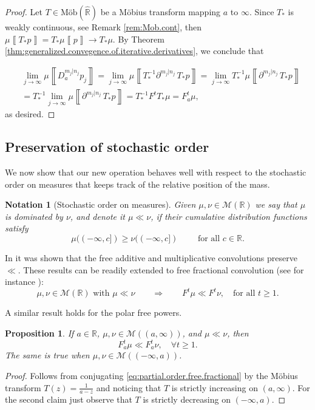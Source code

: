 \documentclass[reqno,11pt]{amsart}
\newtheorem{proposition}[theorem]{Proposition}
\newtheorem{notation}[theorem]{Notation}
\theoremstyle{remark}
\newcommand{\rr}{\mathbb{R}}
\newcommand{\MM}{\mathcal{M}}
\newcommand{\diff}[2]{\partial^{#1|#2}\, }  %
\newcommand{\polars}[3]{D_{#1}^{#2|#3}}
\newcommand{\freepower}[1]{F^{#1}}
\newcommand{\pfreepower}[2]{F_{#1}^{#2}}
\newcommand{\mobr}{\text{Möb}(\hat{\rr})}
\newcommand{\meas}[1]{\mu \left\llbracket #1 \right\rrbracket}
\begin{document}
\begin{proof}
Let $T\in\mobr $ be a Möbius transform mapping $ a $ to $\infty$. Since $ T_* $ is weakly continuous, see Remark \ref{rem:Mob.cont}, then $ \meas{T_* {p}}=T_*\meas{p} \to T_*\mu$. By Theorem \ref{thm:generalized.convegence.of.iterative.derivatives}, we conclude that

\begin{align*}
    &\lim_{j\to\infty} \meas{\polars{a}{m_j}{n_j} p_j}=\lim_{j\to \infty} \meas{T_*^{-1}\diff{m_j}{n_j}T_* p} = \lim_{j\to \infty} T_*^{-1}\meas{\diff{m_j}{n_j}T_* p}\\
    &= T_*^{-1}\lim_{j\to \infty} \meas{\diff{m_j}{n_j}T_* {p}} = T_*^{-1}\freepower{t}T_*\mu= \pfreepower{a}{t}\mu,
\end{align*}
as desired.
\end{proof}


\subsection{Preservation of stochastic order}
We now show that our new operation behaves well with respect to the stochastic order on measures that keeps track of the relative position of the mass.

\begin{notation}[Stochastic order on measures]
Given $\mu, \nu\in \MM(\rr)$ we say that $\mu$ is dominated by $\nu$, and denote it $\mu \ll \nu$, if their cumulative distribution functions satisfy
\[\mu((-\infty,c]) \geq \nu((-\infty,c]) \qquad \text{ for all }c\in \rr.\]
\end{notation}

In \cite[Propositions 4.15 and 4.16]{bercovici1993free} it was shown that the free additive and multiplicative convolutions preserve $\ll$. These results can be readily extended to free fractional convolution (see for instance \cite[Corollary 4.2]{arizmendi2024s}):
\begin{equation}
\label{eq:partial.order.free.fractional}
\mu,\nu\in \MM(\rr) \text{ with }\mu \ll \nu \qquad \Rightarrow \qquad  \freepower{t}\mu \ll \freepower{t}\nu,\quad \text{for all } t\geq 1.    
\end{equation}

A similar result holds for the polar free powers.
\begin{proposition}
    If $ a\in \rr$, $ \mu,\nu\in \MM((a,\infty))$, and $ \mu\ll \nu$, then
    $$ \pfreepower{a}{t}\mu \ll \pfreepower{a}{t}\nu,\quad \forall t\geq 1. $$
    The same is true when $\mu,\nu\in \MM((-\infty,a))$.
\end{proposition}
\begin{proof}
Follows from conjugating \eqref{eq:partial.order.free.fractional} by the M\"{o}bius transform $ T(z)=\tfrac{1}{a-z} $ and noticing that $T$ is strictly increasing on $ (a,\infty) $. For the second claim just observe that $T$ is strictly decreasing on $ (-\infty,a) $.
\end{proof}
\end{document}
